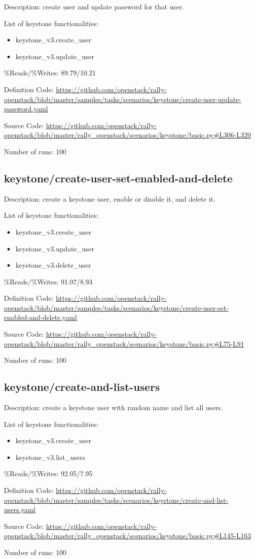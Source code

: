 Description: create user and update password for that user.

List of keystone functionalities:
\begin{itemize}
\item    keystone\_v3.create\_user
\item    keystone\_v3.update\_user
\end{itemize}
\%Reads/\%Writes: 89.79/10.21

Definition Code: \url{https://github.com/openstack/rally-openstack/blob/master/samples/tasks/scenarios/keystone/create-user-update-password.yaml}

Source Code: \url{https://github.com/openstack/rally-openstack/blob/master/rally\_openstack/scenarios/keystone/basic.py#L306-L320}

Number of runs: 100


\subsection{keystone/create-user-set-enabled-and-delete}

Description: create a keystone user, enable or disable it, and delete it.

List of keystone functionalities:
\begin{itemize}
\item    keystone\_v3.create\_user
\item    keystone\_v3.update\_user
\item    keystone\_v3.delete\_user
\end{itemize}
\%Reads/\%Writes: 91.07/8.93

Definition Code: \url{https://github.com/openstack/rally-openstack/blob/master/samples/tasks/scenarios/keystone/create-user-set-enabled-and-delete.yaml}

Source Code: \url{https://github.com/openstack/rally-openstack/blob/master/rally\_openstack/scenarios/keystone/basic.py#L75-L91}

Number of runs: 100

\subsection{keystone/create-and-list-users}

Description: create a keystone user with random name and list all users.

List of keystone functionalities:
\begin{itemize}
\item    keystone\_v3.create\_user
\item    keystone\_v3.list\_users
\end{itemize}
\%Reads/\%Writes: 92.05/7.95

Definition Code: \url{https://github.com/openstack/rally-openstack/blob/master/samples/tasks/scenarios/keystone/create-and-list-users.yaml}

Source Code: \url{https://github.com/openstack/rally-openstack/blob/master/rally\_openstack/scenarios/keystone/basic.py#L145-L163}

Number of runs: 100
